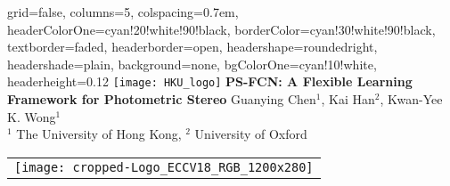 \documentclass[landscape,a0paper,fontscale=0.292]{baposter}
\begin{document}
\begin{poster}{
 grid=false,
 columns=5,
 colspacing=0.7em,
 headerColorOne=cyan!20!white!90!black,
 borderColor=cyan!30!white!90!black,
 textborder=faded,
 headerborder=open,
 headershape=roundedright,
 headershade=plain,
 background=none,
 bgColorOne=cyan!10!white,
 headerheight=0.12\textheight}
 {
      \texttt{[image: HKU\_logo]}
      \makebox[0.01\textwidth]{} 
      \makebox[0.04\textwidth]{} 
 }
 {\sc\huge\bf PS-FCN: A Flexible Learning Framework for Photometric Stereo}
 {\vspace{0.3em} Guanying Chen$^1$, Kai Han$^2$, Kwan-Yee K. Wong$^1$ \\[0.2em]
 {$^1$ The University of Hong Kong, $^2$ University of Oxford\\[0.2em] }}
 {
    \begin{tabular}{r}
        \texttt{[image: cropped-Logo\_ECCV18\_RGB\_1200x280]}
    \end{tabular}
 }


\end{poster}
\end{document}
